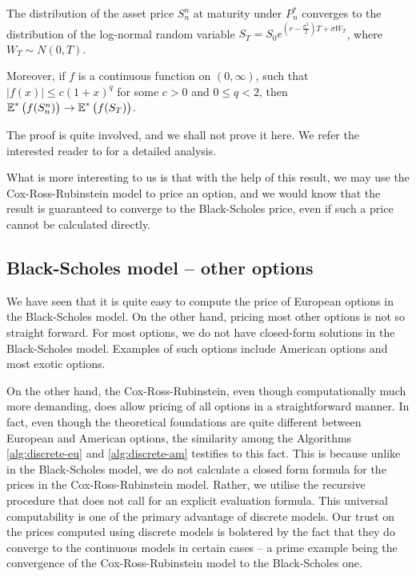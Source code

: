 \begin{thm}
	The distribution of the asset price $ S_n^n $ at maturity under $ P_n^* $ converges to the distribution of the log-normal random variable $ S_T = S_0 e^{ ( r - \frac{\sigma^2}{2} ) T + \sigma W_T } $, where $ W_T \sim N(0, T) $.
	
	Moreover, if $ f $ is a continuous function on $ (0, \infty) $, such that $ |f(x)| \le c(1+x)^q $ for some $ c > 0 $ and $ 0 \le q < 2 $, then $ \operatorname{\mathbb{E}}^* \left( f(S_n^n) \right) \to \operatorname{\mathbb{E}}^* \left( f(S_T) \right) $.
\end{thm}

The proof is quite involved, and we shall not prove it here. We refer the interested reader to \cite{He1989} for a detailed analysis.

What is more interesting to us is that with the help of this result, we may use the Cox-Ross-Rubinstein model to price an option, and we would know that the result is guaranteed to converge to the Black-Scholes price, even if such a price cannot be calculated directly.


\subsection{Black-Scholes model -- other options}
\label{subsec:continuous-other}

We have seen that it is quite easy to compute the price of European options in the Black-Scholes model. On the other hand, pricing most other options is not so straight forward. For most options, we do not have closed-form solutions in the Black-Scholes model. Examples of such options include American options and most exotic options.

On the other hand, the Cox-Ross-Rubinstein, even though computationally much more demanding, does allow pricing of all options in a straightforward manner. In fact, even though the theoretical foundations are quite different between European and American options, the similarity among the Algorithms \ref{alg:discrete-eu} and \ref{alg:discrete-am} testifies to this fact. This is because unlike in the Black-Scholes model, we do not calculate a closed form formula for the prices in the Cox-Ross-Rubinstein model. Rather, we utilise the recursive procedure that does not call for an explicit evaluation formula. This universal computability is one of the primary advantage of discrete models. Our trust on the prices computed using discrete models is bolstered by the fact that they do converge to the continuous models in certain cases -- a prime example being the convergence of the Cox-Ross-Rubinstein model to the Black-Scholes one.

